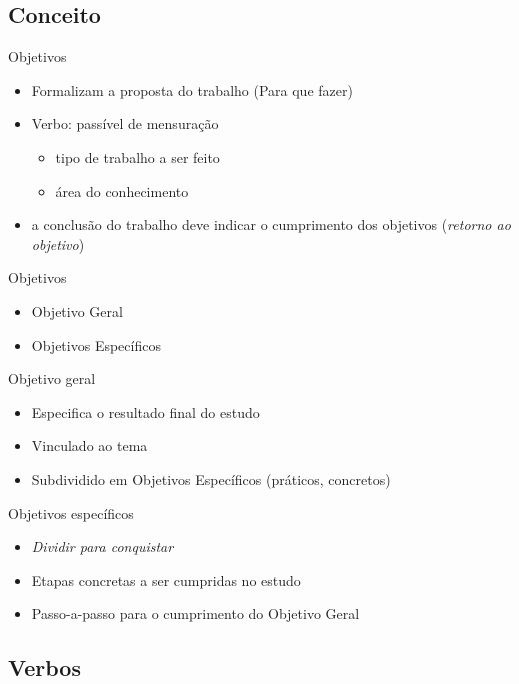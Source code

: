 \documentclass{beamer}
\begin{document}
\subsection{Conceito}

\begin{frame}{Objetivos}
  \begin{itemize}
  \item Formalizam a proposta do trabalho (\alert{Para que} fazer)
  \item \alert{Verbo}: passível de mensuração
    \begin{itemize}
    \item tipo de trabalho a ser feito
    \item área do conhecimento
    \end{itemize}
    \item a conclusão do trabalho deve indicar o cumprimento dos
      objetivos ({\em retorno ao objetivo})
  \end{itemize}
\end{frame}

\begin{frame}{Objetivos}
  \begin{itemize}
  \item Objetivo Geral
  \item Objetivos Específicos
  \end{itemize}
\end{frame}

\begin{frame}{Objetivo geral}
  \begin{itemize}
  \item Especifica o resultado final do estudo
  \item Vinculado ao tema
  \item Subdividido em Objetivos Específicos (práticos, concretos)
  \end{itemize}
\end{frame}

\begin{frame}{Objetivos específicos}
  \begin{itemize}
  \item {\em Dividir para conquistar}
  \item Etapas concretas a ser cumpridas no estudo
  \item Passo-a-passo para o cumprimento do Objetivo Geral
  \end{itemize}
\end{frame}

\subsection{Verbos}
\end{document}
